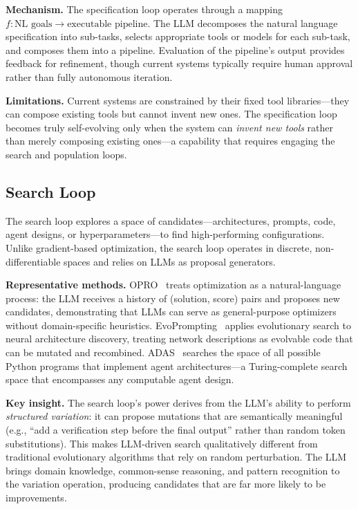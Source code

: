\documentclass[11pt,a4paper]{article}
\begin{document}
\textbf{Mechanism.} The specification loop operates through a mapping $f: \text{NL goals} \to \text{executable pipeline}$. The LLM decomposes the natural language specification into sub-tasks, selects appropriate tools or models for each sub-task, and composes them into a pipeline. Evaluation of the pipeline's output provides feedback for refinement, though current systems typically require human approval rather than fully autonomous iteration.

\textbf{Limitations.} Current systems are constrained by their fixed tool libraries---they can compose existing tools but cannot invent new ones. The specification loop becomes truly self-evolving only when the system can \emph{invent new tools} rather than merely composing existing ones---a capability that requires engaging the search and population loops.

\subsection{Search Loop}

The search loop explores a space of candidates---architectures, prompts, code, agent designs, or hyperparameters---to find high-performing configurations. Unlike gradient-based optimization, the search loop operates in discrete, non-differentiable spaces and relies on LLMs as proposal generators.

\textbf{Representative methods.} OPRO~\citep{yang2023opro} treats optimization as a natural-language process: the LLM receives a history of (solution, score) pairs and proposes new candidates, demonstrating that LLMs can serve as general-purpose optimizers without domain-specific heuristics. EvoPrompting~\citep{chen2024evoprompting} applies evolutionary search to neural architecture discovery, treating network descriptions as evolvable code that can be mutated and recombined. ADAS~\citep{hu2024adas} searches the space of all possible Python programs that implement agent architectures---a Turing-complete search space that encompasses any computable agent design.

\textbf{Key insight.} The search loop's power derives from the LLM's ability to perform \emph{structured variation}: it can propose mutations that are semantically meaningful (e.g., ``add a verification step before the final output'' rather than random token substitutions). This makes LLM-driven search qualitatively different from traditional evolutionary algorithms that rely on random perturbation. The LLM brings domain knowledge, common-sense reasoning, and pattern recognition to the variation operation, producing candidates that are far more likely to be improvements.
\end{document}
